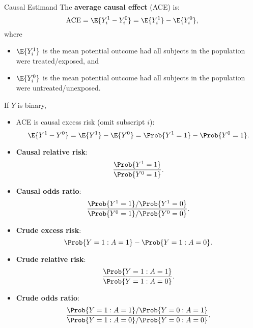 \begin{Regular}{Causal Estimand}
    The \textbf{average causal effect} (ACE) is:
    \[ \ACE=\E{Y_i^1-Y_i^0}=\E{Y_i^1}-\E{Y_i^0}, \]
    where
    \begin{itemize}
        \item $ \E{Y_i^1} $ is the mean potential outcome had all subjects in the population
              were treated/exposed, and
        \item $ \E{Y_i^0} $ is the mean potential outcome had all subjects in the population were untreated/unexposed.
    \end{itemize}
    \tcblower{}
    If $ Y $ is binary,
    \begin{itemize}
        \item ACE is causal excess risk (omit subscript $ i $):
              \[ \E{Y^1-Y^0}=\E{Y^1}-\E{Y^0}=\Prob{Y^1=1}-\Prob{Y^0=1}. \]
        \item \textbf{Causal relative risk}:
              \[ \frac{\Prob{Y^1=1}}{\Prob{Y^0=1}}. \]
        \item \textbf{Causal odds ratio}:
              \[ \frac{\Prob{Y^1=1}/\Prob{Y^1=0}}{\Prob{Y^0=1}/\Prob{Y^0=0}}. \]
        \item \textbf{Crude excess risk}:
              \[ \Prob{Y=1\given A=1}-\Prob{Y=1\given A=0}. \]
        \item \textbf{Crude relative risk}:
              \[ \frac{\Prob{Y=1\given A=1}}{\Prob{Y=1\given A=0}}. \]
        \item \textbf{Crude odds ratio}:
              \[ \frac{\Prob{Y=1\given A=1}/\Prob{Y=0\given A=1}}{\Prob{Y=1\given A=0}/\Prob{Y=0\given A=0}}. \]
    \end{itemize}
\end{Regular}
